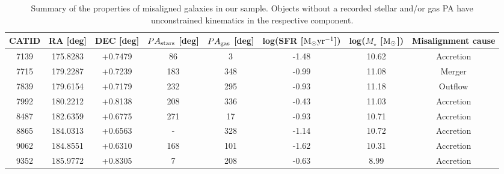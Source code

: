 \documentclass[fleqn,usenatbib]{mnras}
\begin{document}
\begin{table}
\centering
\caption{Summary of the properties of misaligned galaxies in our sample. Objects without a recorded stellar and/or gas PA have unconstrained kinematics in the respective component. }\label{tab:TableA2}

\begin{tabular*}{\linewidth}{cccccccc}
\hline
\multicolumn{1}{l}{CATID} & \multicolumn{1}{l}{RA [deg]} & \multicolumn{1}{l}{DEC [deg]} & \multicolumn{1}{l}{$PA_{\rm{stars}}$ [deg]} & \multicolumn{1}{l}{$PA_{\rm{gas}}$ [deg]} & \multicolumn{1}{l}{log(SFR [$\rm{M_{\odot}yr^{-1}}$])} & \multicolumn{1}{l}{log($M_{\star}$ [$\rm{M_{\odot}}$])} & \multicolumn{1}{l}{Misalignment cause} \\
\hline
7139                      & 175.8283              & +0.7479                & 86                            & 3                           & -1.48%
& 10.62%
& Accretion                   \\
7715                      & 179.2287              & +0.7239                 & 183                           & 348                         & -0.99%
& 11.08%
& Merger                    \\
7839                      & 179.6154              & +0.7179                & 232                           & 295                         & -0.93%
& 11.18%
& Outflow                    \\
7992                      & 180.2212              & +0.8138                & 208                           & 336                         & -0.43%
& 11.03%
& Accretion                    \\
8487                      & 182.6359              & +0.6775                & 271                           & 17                          & -0.93%
& 10.71%
& Accretion                   \\ 
8865                      & 184.0313              & +0.6563                & -                           & 328                         & -1.14%
& 10.72%
& Accretion                    \\
9062                      & 184.8551             & +0.6310                & 168                           & 101                         & -1.62%
& 10.31%
& Accretion                    \\
9352                      & 185.9772             & +0.8305                 & 7                             & 208                         & -0.63%
& 8.99               & Accretion                   \\

\end{tabular*}
\end{table}
\end{document}
